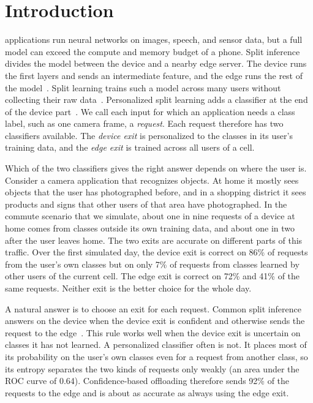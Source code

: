 \section{Introduction}
\label{sec:intro}

 applications run neural networks on images, speech, and sensor data, but a full model can exceed the compute and memory budget of a phone. Split inference divides the model between the device and a nearby edge server. The device runs the first layers and sends an intermediate feature, and the edge runs the rest of the model~\cite{kang2017neurosurgeon,laskaridis2020spinn}. Split learning trains such a model across many users without collecting their raw data~\cite{gupta2018distributed,vepakomma2018split,thapa2022splitfed}. Personalized split learning adds a classifier at the end of the device part~\cite{han2023splitgp,rizwan2026splitomc}. We call each input for which an application needs a class label, such as one camera frame, a \emph{request}. Each request therefore has two classifiers available. The \emph{device exit} is personalized to the classes in its user's training data, and the \emph{edge exit} is trained across all users of a cell.

Which of the two classifiers gives the right answer depends on where the user is. Consider a camera application that recognizes objects. At home it mostly sees objects that the user has photographed before, and in a shopping district it sees products and signs that other users of that area have photographed. In the commute scenario that we simulate, about one in nine requests of a device at home comes from classes outside its own training data, and about one in two after the user leaves home. The two exits are accurate on different parts of this traffic. Over the first simulated day, the device exit is correct on 86\% of requests from the user's own classes but on only 7\% of requests from classes learned by other users of the current cell. The edge exit is correct on 72\% and 41\% of the same requests. Neither exit is the better choice for the whole day.

A natural answer is to choose an exit for each request. Common split inference answers on the device when the device exit is confident and otherwise sends the request to the edge~\cite{han2023splitgp,laskaridis2020spinn,teerapittayanon2016branchynet}. This rule works well when the device exit is uncertain on classes it has not learned. A personalized classifier often is not. It places most of its probability on the user's own classes even for a request from another class, so its entropy separates the two kinds of requests only weakly (an area under the ROC curve of 0.64). Confidence-based offloading therefore sends 92\% of the requests to the edge and is about as accurate as always using the edge exit.

